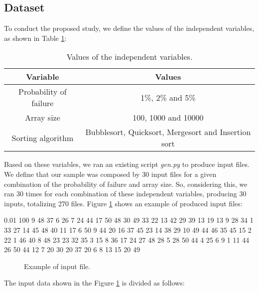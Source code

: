 \subsection{Dataset}

To conduct the proposed study, we define the values of the independent variables, as shown in Table \ref{table-independent-variables-values}:

\begin{table}[H]
    \caption{Values of the independent variables.}
    \begin{center}
    \begin{tabular}{|c|c|}
    \hline
    \textbf{Variable} & \textbf{Values} \\
    \hline
    Probability of failure & 1\%, 2\% and 5\% \\
    \hline
    Array size & 100, 1000 and 10000 \\
    \hline
    Sorting algorithm & Bubblesort, Quicksort, Mergesort and Insertion sort \\
    \hline
    \end{tabular}
    \label{table-independent-variables-values}
    \end{center}
\end{table}

Based on these variables, we ran an existing script \textit{gen.py} to produce input files. We define that our sample was composed by 30 input files for a given combination of the probability of failure and array size. So, considering this, we ran 30 times for each combination of these independent variables, producing 30 inputs, totalizing 270 files. Figure \ref{fig-input-file-example} shows an example of produced input files:

\begin{verbbox}[\mbox{}]
0.01 100 9 48 37 6 26 7 24 44 17 50 48 30 49 33 22 13 42 29 39 13 19 13 9 28 
34 1 33 27 14 45 48 40 11 17 6 50 9 44 20 16 37 45 23 14 38 29 10 49 44 46 35
45 15 2 22 1 46 40 8 48 23 23 32 35 3 15 8 36 17 24 27 48 28 5 28 50 44 4 25 
6 9 1 11 44 26 50 44 12 7 20 30 20 37 20 6 8 13 15 20 49
\end{verbbox}

\begin{figure}[H]
    \centering
    \fbox{
    \theverbbox
    }
    \caption{Example of input file.}
    \label{fig-input-file-example}
\end{figure}

The input data shown in the Figure \ref{fig-input-file-example} is divided as follows:


